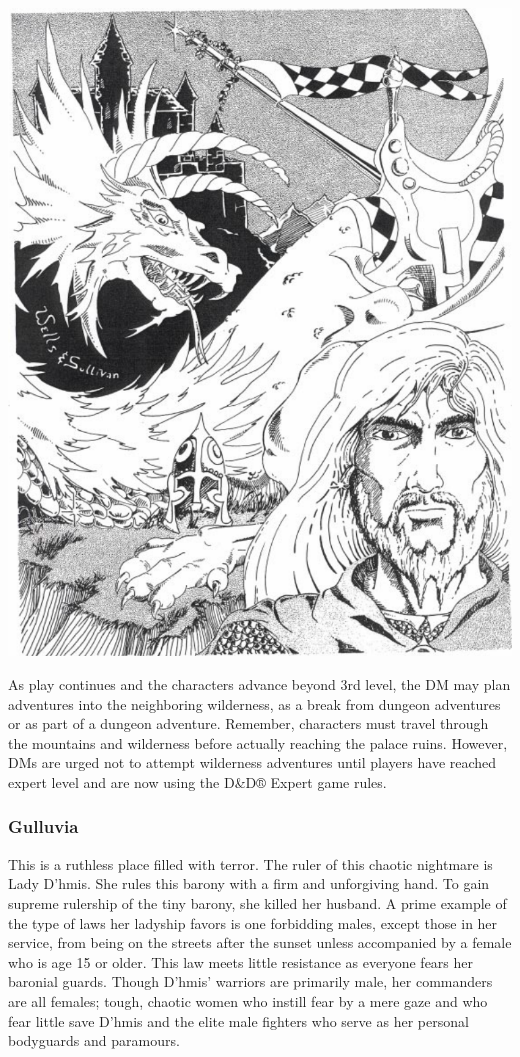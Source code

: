 \documentclass[palace_of_the_silver_princess]{subfiles}
\begin{document}
\includegraphics[width=\columnwidth]{img/pic1.png}

As play continues and the characters advance beyond 3rd level, the DM
may plan adventures into the neighboring wilderness, as a break from
dungeon adventures or as part of a dungeon adventure.  Remember,
characters must travel through the mountains and wilderness before
actually reaching the palace ruins. However, DMs are urged not to
attempt wilderness adventures until players have reached expert level
and are now using the D\&D® Expert game rules.

\subsubsection{Gulluvia}

This is a ruthless place filled with terror. The ruler of this chaotic
nightmare is Lady D’hmis. She rules this barony with a firm and
unforgiving hand. To gain supreme rulership of the tiny barony, she
killed her husband. A prime example of the type of laws her ladyship
favors is one forbidding males, except those in her service, from being
on the streets after the sunset unless accompanied by a female who is
age 15 or older. This law meets little resistance as everyone fears her
baronial guards. Though D’hmis’ warriors are primarily male, her
commanders are all females; tough, chaotic women who instill fear by a
mere gaze and who fear little save D’hmis and the elite male fighters
who serve as her personal bodyguards and paramours.
\end{document}

